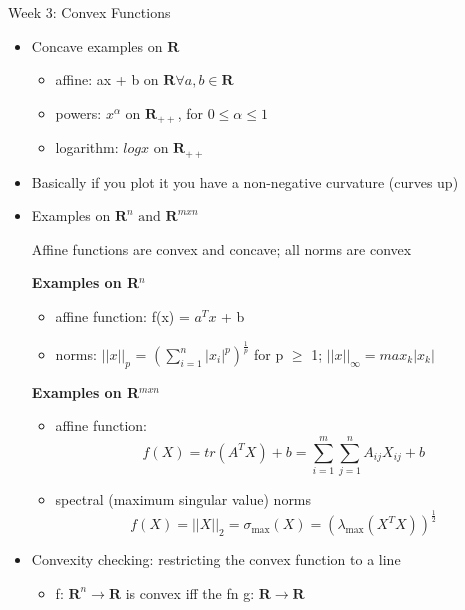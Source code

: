 \documentclass{article}
\begin{document}
\begin{homeworkProblemName}{{\LARGE Week 3: Convex Functions}}
\begin{problemAnswer}
{\begin{itemize}
      \item Concave examples on $\bm{R}$
        \begin{itemize}
        \item affine: ax + b on $\bm{R} \forall a, b \in \bm{R}$
        \item powers: $x^{\alpha}$ on $\bm{R}_{++}$, for $0 \leq \alpha \leq 1$
        \item logarithm: $log x$ on $\bm{R}_{++}$
        \end{itemize}

      \item Basically if you plot it you have a non-negative curvature (curves up)

      \item Examples on $\bm{R}^n \text{ and } \bm{R}^{m x n}$

        Affine functions are convex and concave; all norms are convex

        \textbf{Examples on R$^n$}

        \begin{itemize}
        \item affine function: f(x) = $a^Tx$ + b
        \item norms: $||x||_p$ = $(\sum_{i=1}^n |x_i|^p)^{\frac{1}{p}}$ for p $\geq$
          1; $||x||_{\infty} = max_k |x_k|$
        \end{itemize}

        \textbf{Examples on R$^{m x n}$}
        \begin{itemize}
        \item affine function:
          $$ f(X) = tr(A^TX) + b = \sum_{i=1}^m \sum_{j=1}^n A_{ij}X_{ij} + b $$
        \item spectral (maximum singular value) norms
          $$ f(X) = ||X||_2 = \sigma_{\text{max}}(X) = (\lambda_{\text{max}}(X^TX))^{\frac{1}{2}} $$
        \end{itemize}
      \end{itemize}
      }\end{problemAnswer}

    \newpage

    \begin{problemAnswer}{
        \begin{itemize}
        \item Convexity checking: restricting the convex function to a line
          \begin{itemize}
          \item f: $\bm{R}^n \rightarrow \bm{R} $ is convex iff the fn g: $\bm{R} \rightarrow
            \bm{R}$


\end{itemize}
\end{itemize}}
\end{problemAnswer}
\end{homeworkProblemName}
\end{document}
